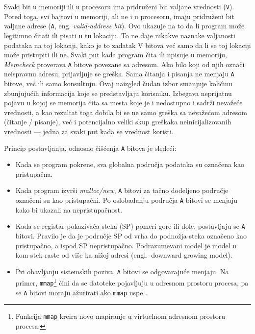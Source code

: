 \documentclass[12pt,oneside]{memoir}
\theoremstyle{plain}
\theoremstyle{definition}
\begin{document}
Svaki bit u memoriji ili u procesoru ima pridruženi bit valjane vrednosti (\texttt{V}). Pored toga, svi bajtovi u memoriji, ali ne i u procesoru, imaju pridruženi bit valjane adrese (\texttt{A}, eng. \textit{valid-address bit}). Ovo ukazuje na to da li program može legitimno čitati ili pisati u tu lokaciju. To ne daje nikakve naznake valjanosti podataka na toj lokaciji, kako je to zadatak V bitova već samo da li se toj lokaciji može pristupiti ili ne. Svaki put kada program čita ili upisuje u memoriju, \textit{Memcheck} proverava \texttt{A} bitove povezane sa adresom. Ako bilo koji od njih označi neispravnu adresu, prijavljuje se greška. Sama čitanja i pisanja ne menjaju \texttt{A} bitove, već ih samo konsultuju. Ovaj naizgled čudan izbor smanjuje količinu zbunjujućih informacija koje se predstavljaju korisniku. Izbegava neprijatnu pojavu u kojoj se memorija čita sa mesta koje je i nedostupno i sadrži nevažeće vrednosti, a kao rezultat toga dobila bi se ne samo greška sa nevažećom adresom (čitanje / pisanje), već i potencijalno veliki skup greškaka neinicijalizovanih vrednosti --- jedna za svaki put kada se vrednost koristi.

Princip postavljanja, odnosno čišćenja \texttt{A} bitova je sledeći:
\begin{itemize}
\item Kada se program pokrene, sva globalna područja podataka su označena kao pristupačna.
\item Kada program izvrši \textit{malloc/new}, \texttt{A} bitovi za tačno dodeljeno područje označeni su kao pristupačni. Po oslobađanju područja \texttt{A} bitovi se menjaju kako bi ukazali na nepristupačnost.
\item Kada se registar pokazivača steka (SP) pomeri gore ili dole, postavljaju se \texttt{A} bitovi. Pravilo je da je područje SP od vrha do podnožja steka označeno kao pristupačno, a ispod SP nepristupačno. Podrazumevani model je model u kom stek raste od više ka nižoj adresi (engl.~downward growing model).
\item Pri obavljanju sistemskih poziva, \texttt{A} bitovi se odgovarajuće menjaju. Na primer, \texttt{mmap}\footnote{Funkcija \texttt{mmap} kreira novo mapiranje u virtuelnom adresnom prostoru procesa.} čini da se datoteke pojavljuju u adresnom prostoru procesa, pa se \texttt{A} bitovi moraju ažurirati ako \texttt{mmap} uspe \cite{Memcheck}. 
\end{itemize}
\end{document}
